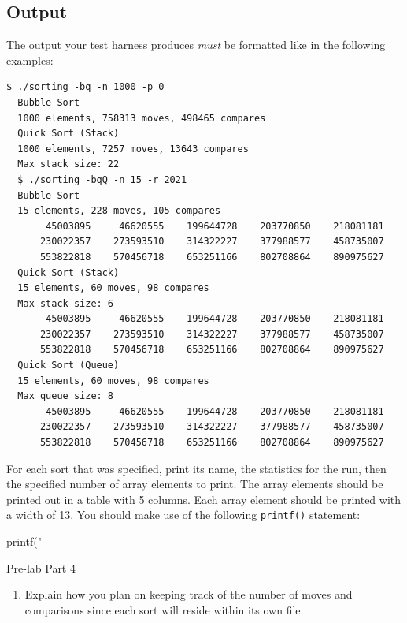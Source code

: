\documentclass[11pt]{article}
\begin{document}
\subsection{Output}

The output your test harness produces \emph{must} be formatted like in
the following examples:

\begin{lstlisting}[style=bashstyle]
  $ ./sorting -bq -n 1000 -p 0
  Bubble Sort
  1000 elements, 758313 moves, 498465 compares
  Quick Sort (Stack)
  1000 elements, 7257 moves, 13643 compares
  Max stack size: 22
  $ ./sorting -bqQ -n 15 -r 2021
  Bubble Sort
  15 elements, 228 moves, 105 compares
       45003895     46620555    199644728    203770850    218081181
      230022357    273593510    314322227    377988577    458735007
      553822818    570456718    653251166    802708864    890975627
  Quick Sort (Stack)
  15 elements, 60 moves, 98 compares
  Max stack size: 6
       45003895     46620555    199644728    203770850    218081181
      230022357    273593510    314322227    377988577    458735007
      553822818    570456718    653251166    802708864    890975627
  Quick Sort (Queue)
  15 elements, 60 moves, 98 compares
  Max queue size: 8
       45003895     46620555    199644728    203770850    218081181
      230022357    273593510    314322227    377988577    458735007
      553822818    570456718    653251166    802708864    890975627
\end{lstlisting}

For each sort that was specified, print its name, the statistics for the
run, then the specified number of array elements to print. The array
elements should be printed out in a table with 5 columns. Each array
element should be printed with a width of 13. You should make use of the
following \texttt{printf()} statement:

\begin{codelisting}{}
printf("%
\end{codelisting}

\medskip
\begin{prelab}{Pre-lab Part 4}
    \begin{enumerate}
        \item Explain how you plan on keeping track of the number of
          moves and comparisons since each sort will reside within its
          own file.
    \end{enumerate}
\end{prelab}
\end{document}
